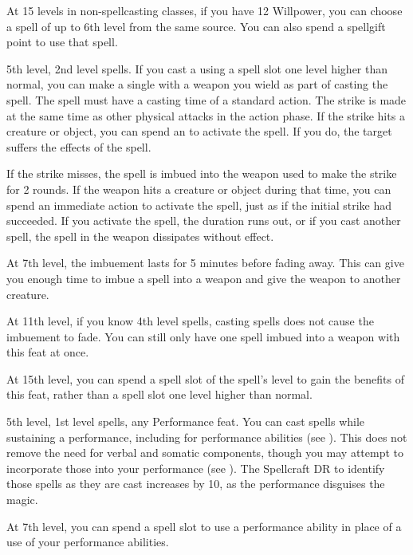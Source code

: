     At 15 levels in non-spellcasting classes, if you have 12 Willpower, you can choose a spell of up to 6th level from the same source. You can also spend a spellgift point to use that spell.

    \featpre 5th level, 2nd level spells.
    \featben If you cast a  using a spell slot one level higher than normal, you can make a single  with a weapon you wield as part of casting the spell.
    The spell must have a casting time of a standard action.
    The strike is made at the same time as other physical attacks in the action phase.
    If the strike hits a creature or object, you can spend an  to activate the spell.
    If you do, the target suffers the effects of the spell.

    If the strike misses, the spell is imbued into the weapon used to make the strike for 2 rounds.
    If the weapon hits a creature or object during that time, you can spend an immediate action to activate the spell, just as if the initial strike had succeeded.
    If you activate the spell, the duration runs out, or if you cast another spell, the spell in the weapon dissipates without effect.

    At 7th level, the imbuement lasts for 5 minutes before fading away.
    This can give you enough time to imbue a spell into a weapon and give the weapon to another creature.

    At 11th level, if you know 4th level spells, casting spells does not cause the imbuement to fade.
    You can still only have one spell imbued into a weapon with this feat at once.

    At 15th level, you can spend a spell slot of the spell's level to gain the benefits of this feat, rather than a spell slot one level higher than normal.

    \featpres 5th level, 1st level spells, any Performance feat.
    \featben You can cast spells while sustaining a performance, including for performance abilities (see ).
    This does not remove the need for verbal and somatic components, though you may attempt to incorporate those into your performance (see ).
    The Spellcraft DR to identify those spells as they are cast increases by 10, as the performance disguises the magic.

    At 7th level, you can spend a spell slot to use a performance ability in place of a use of your performance abilities.

